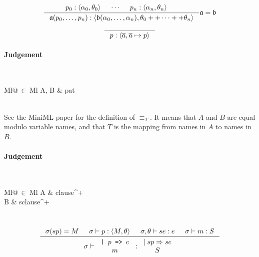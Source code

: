 \[
\inference
{
  p_0 : \langle \alpha_0, \theta_0 \rangle &
  \cdots &
  p_n : \langle \alpha_n, \theta_n \rangle &
}
{
  \mathfrak{a} (p_0, \ldots, p_n) :
  \langle \mathfrak{b} (\alpha_0, \ldots, \alpha_n), \theta_0 ++ \cdots ++
  \theta_n \rangle
}
{
  \mathfrak{a} = \mathfrak{b}
}
\]

\[
\inference
{
}
{
  p : \langle \overline{a}, \overline{a} \mapsto p \rangle
}
\]

\paragraph{Judgement} \\
\indent\begin{tabular}{Ml@{$\ \in\ $}Ml}
  A, B & pat
\end{tabular}\\

See the MiniML paper for the definition of $\equiv_T$. It means that $A$ and $B$
are equal modulo variable names, and that $T$ is the mapping from names in $A$
to names in $B$.

\paragraph{Judgement} \\
\indent\begin{tabular}{Ml@{$\ \in\ $}Ml}
  A & clause^{+}\\
  B & sclause^{+}
\end{tabular}\\

\[
\inference
{
  \sigma(sp) = M &
  \sigma |- p : \langle M, \theta \rangle &
  \sigma, \theta |- se : e &
  \sigma |- m : S
}
{
  \sigma |-
  \begin{tabular}{c}
    \texttt{| $p$ => $e$}\\
    $m$
  \end{tabular}
  :
  \begin{tabular}{c}
    $\mid sp => se$\\
    $S$
  \end{tabular}
}
\]


